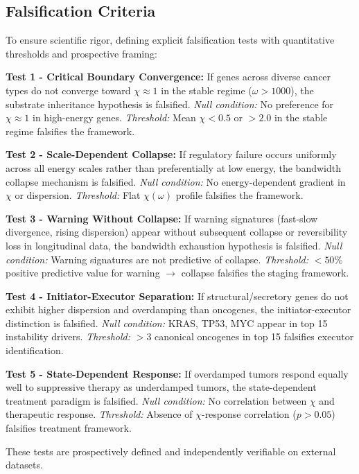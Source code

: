 \documentclass[11pt,letterpaper]{article}
\begin{document}
\subsection{Falsification Criteria}

To ensure scientific rigor, defining explicit falsification tests with quantitative thresholds and prospective framing:

\textbf{Test 1 - Critical Boundary Convergence:} If genes across diverse cancer types do not converge toward $\chi \approx 1$ in the stable regime ($\omega > 1000$), the substrate inheritance hypothesis is falsified. \textit{Null condition:} No preference for $\chi \approx 1$ in high-energy genes. \textit{Threshold:} Mean $\chi < 0.5$ or $> 2.0$ in the stable regime falsifies the framework.

\textbf{Test 2 - Scale-Dependent Collapse:} If regulatory failure occurs uniformly across all energy scales rather than preferentially at low energy, the bandwidth collapse mechanism is falsified. \textit{Null condition:} No energy-dependent gradient in $\chi$ or dispersion. \textit{Threshold:} Flat $\chi(\omega)$ profile falsifies the framework.

\textbf{Test 3 - Warning Without Collapse:} If warning signatures (fast-slow divergence, rising dispersion) appear without subsequent collapse or reversibility loss in longitudinal data, the bandwidth exhaustion hypothesis is falsified. \textit{Null condition:} Warning signatures are not predictive of collapse. \textit{Threshold:} $<50\%$ positive predictive value for warning $\to$ collapse falsifies the staging framework.

\textbf{Test 4 - Initiator-Executor Separation:} If structural/secretory genes do not exhibit higher dispersion and overdamping than oncogenes, the initiator-executor distinction is falsified. \textit{Null condition:} KRAS, TP53, MYC appear in top 15 instability drivers. \textit{Threshold:} $>3$ canonical oncogenes in top 15 falsifies executor identification.

\textbf{Test 5 - State-Dependent Response:} If overdamped tumors respond equally well to suppressive therapy as underdamped tumors, the state-dependent treatment paradigm is falsified. \textit{Null condition:} No correlation between $\chi$ and therapeutic response. \textit{Threshold:} Absence of $\chi$-response correlation ($p > 0.05$) falsifies treatment framework.

These tests are prospectively defined and independently verifiable on external datasets.
\end{document}
